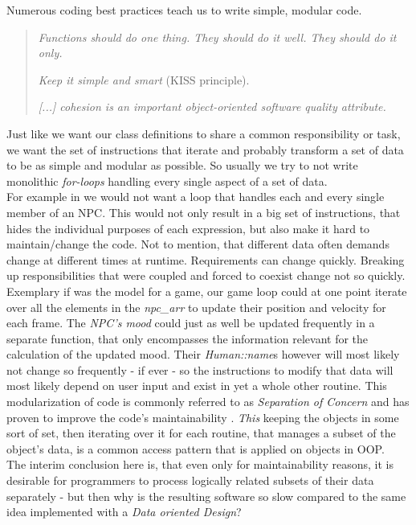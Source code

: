 Numerous coding best practices teach us to write simple, modular code.
\begin{quote}
	\textit{Functions should do one thing. They should do it well. They should do it only.} 
	
	\textit{Keep it simple and smart} (KISS principle). 
	
	\textit{[...] cohesion is an important object-oriented
		software quality attribute.}
\end{quote}
Just like we want our class definitions to share a common responsibility or task, we want the set of instructions that iterate and probably transform a set of data to be as simple and modular as possible. So usually we try to not write monolithic \textit{for-loops} handling every single aspect of a set of data.\\ For example in  we would not want a loop that handles each and every single member of an NPC. This would not only result in a big set of instructions, that hides the individual purposes of each expression, but also make it hard to maintain/change the code. Not to mention, that different data often demands change at different times at runtime. Requirements can change quickly. Breaking up responsibilities that were coupled and forced to coexist change not so quickly.\\
Exemplary if  was the model for a game, our game loop could at one point iterate over all the elements in the \textit{npc\_arr} to update their position and velocity for each frame. The \textit{NPC's mood} could just as well be updated frequently in a separate function, that only encompasses the information relevant for the calculation of the updated mood.
Their \textit{Human::name}s however will most likely not change so frequently - if ever - so the instructions to modify that data will most likely depend on user input and exist in yet a whole other routine. This modularization of code is commonly referred to as \textit{Separation of Concern} and has proven to improve the code's maintainability .
\textit{This} keeping the objects in some sort of set, then iterating over it for each routine, that manages a subset of the object's data, is a common access pattern that is applied on objects in OOP.\\
The interim conclusion here is, that even only for maintainability reasons, it is desirable for programmers to process logically related subsets of their data separately - but then why is the resulting software so slow compared to the same idea implemented with a \textit{Data oriented Design}?\\
